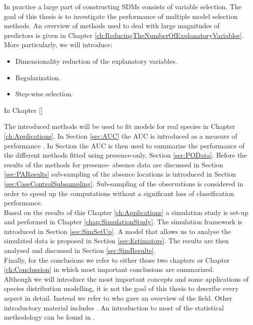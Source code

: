 In practice a large part of constructing SDMs consists of variable selection. The goal of this thesis is to investigate the performance of multiple model selection methods. An overview of methods used to deal with large magnitudes of predictors is given in Chapter \ref{ch:ReducingTheNumberOfExplanatoryVariables}. More particularly, we will introduce: 
\begin{itemize}
\item Dimensionality reduction of the explanatory variables. 
\item Regularization. 
\item Step-wise selection. 
\end{itemize}

In Chapter \ref{}


The introduced methods will be used to fit models for real species in Chapter \ref{ch:Applications}. In Section \ref{sec:AUC} the AUC is introduced as a measure of performance . In Section the AUC is then used to summarize the performance of the different methods fitted using presence-only, Section \ref{sec:POData}. Before the results of the methods for presence- absence data are discussed in Section \ref{sec:PAResults} sub-sampling of the absence locations is introduced in Section \ref{sec:CaseControlSubsampling}. Sub-sampling of the observations is considered in order to speed up the computations without a significant loss of classification performance.\\

Based on the results of this Chapter \ref{ch:Applications} a simulation study is set-up and performed in Chapter \ref{chap:SimulationStudy}. The simulation framework is introduced in Section \ref{sec:SimSetUp}. A model that allows us to analyse the simulated data is proposed in Section \ref{sec:Estimators}. The results are then analysed and discussed in Section \ref{sec:SimResults}. \\
 
Finally, for the conclusions we refer to either those two chapters or Chapter \ref{ch:Conclussion} in which most important conclusions are summarized.\\

Although we will introduce the most important concepts and some applications of species distribution modelling, it is not the goal of this thesis to describe every aspect in detail. Instead we refer to \cite{franklin_mapping_2009} who gave an overview of the field. Other introductory material includes
\cite{guisan_predictive_2000, guisan_predicting_2005, elith_species_2009}. An introduction to most of the statistical methodology can be found in \cite{hastie_elements_2009}.





















